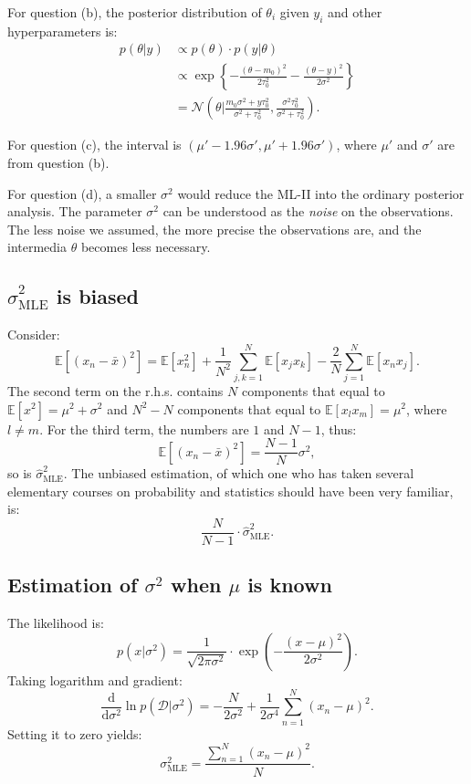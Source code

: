 \documentclass[UTF8]{ctexart}
\begin{document}
For question (b), the posterior distribution of $\theta_{i}$ given $y_{i}$ and other hyperparameters is:
$$
\begin{aligned}
p(\theta|y)&\propto p(\theta)\cdot p(y|\theta)\\
&\propto \exp\left\{-\frac{(\theta-m_{0})^{2}}{2\tau^{2}_{0}}-\frac{(\theta-y)^{2}}{2\sigma^{2}} \right\}\\
&=\mathcal{N}(\theta|\frac{m_{0}\sigma^{2}+y\tau_{0}^{2}}{\sigma^{2}+\tau_{0}^{2}},\frac{\sigma^{2}\tau_{0}^{2}}{\sigma^{2}+\tau_{0}^{2}}).
\end{aligned}
$$

For question (c), the interval is $(\mu'-1.96\sigma',\mu'+1.96\sigma')$, where $\mu'$ and $\sigma'$ are from question (b).

For question (d), a smaller $\sigma^{2}$ would reduce the ML-II into the ordinary posterior analysis.
The parameter $\sigma^{2}$ can be understood as the \emph{noise} on the observations.
The less noise we assumed, the more precise the observations are, and the intermedia $\theta$ becomes less necessary.

\subsection{$\hat{\sigma}^{2}_{\text{MLE}}$ is biased}
Consider:
$$\mathbb{E}[(x_{n}-\bar{x})^{2}]=\mathbb{E}[x_{n}^{2}]+\frac{1}{N^{2}}\sum_{j,k=1}^{N}\mathbb{E}[x_{j}x_{k}]-\frac{2}{N}\sum_{j=1}^{N}\mathbb{E}[x_{n}x_{j}].$$
The second term on the r.h.s. contains $N$ components that equal to $\mathbb{E}[x^{2}]=\mu^{2}+\sigma^{2}$ and $N^{2}-N$ components that equal to $\mathbb{E}[x_{l}x_{m}]=\mu^{2}$, where $l\neq m$.
For the third term, the numbers are $1$ and $N-1$, thus:
$$\mathbb{E}[(x_{n}-\bar{x})^{2}]=\frac{N-1}{N}\sigma^{2},$$
so is $\hat{\sigma}^{2}_{\text{MLE}}$.
The unbiased estimation, of which one who has taken several elementary courses on probability and statistics should have been very familiar, is:
$$\frac{N}{N-1}\cdot \hat{\sigma}^{2}_{\text{MLE}}.$$

\subsection{Estimation of $\sigma^{2}$ when $\mu$ is known}
The likelihood is:
$$p(x|\sigma^{2})=\frac{1}{\sqrt{2\pi\sigma^{2}}}\cdot\exp\left(-\frac{(x-\mu)^{2}}{2\sigma^{2}} \right).$$
Taking logarithm and gradient:
$$\frac{\text{d}}{\text{d}\sigma^{2}}\ln p(\mathcal{D}|\sigma^{2})=-\frac{N}{2\sigma^{2}}+\frac{1}{2\sigma^{4}}\sum_{n=1}^{N}(x_{n}-\mu)^{2}.$$
Setting it to zero yields:
$$\sigma_{\text{MLE}}^{2}=\frac{\sum_{n=1}^{N}(x_{n}-\mu)^{2}}{N}.$$
\end{document}
